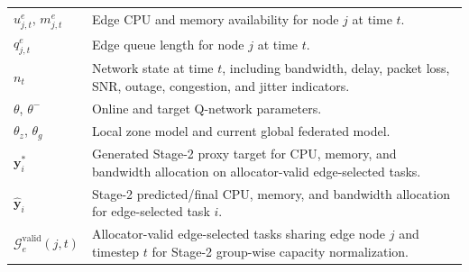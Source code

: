 \begin{table}[!t]
\begin{tabularx}{\textwidth}{@{}lX@{}}
$u^e_{j,t}$, $m^e_{j,t}$ & Edge CPU and memory availability for node $j$ at time $t$. \\
$q^e_{j,t}$ & Edge queue length for node $j$ at time $t$. \\
$n_t$ & Network state at time $t$, including bandwidth, delay, packet loss, SNR, outage, congestion, and jitter indicators. \\
$\theta$, $\theta^-$ & Online and target Q-network parameters. \\
$\theta_z$, $\theta_g$ & Local zone model and current global federated model. \\
$\mathbf{y}_i^{*}$ & Generated Stage-2 proxy target for CPU, memory, and bandwidth allocation on allocator-valid edge-selected tasks. \\
$\hat{\mathbf{y}}_i$ & Stage-2 predicted/final CPU, memory, and bandwidth allocation for edge-selected task $i$. \\
$\mathcal{G}^{\mathrm{valid}}_e(j,t)$ & Allocator-valid edge-selected tasks sharing edge node $j$ and timestep $t$ for Stage-2 group-wise capacity normalization. \\
\bottomrule
\end{tabularx}
\end{table}
